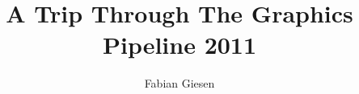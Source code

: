 \documentclass[DIV10]{scrreprt}
\begin{document}


\title{A Trip Through The Graphics Pipeline 2011}
\author{Fabian Giesen}
\maketitle
\tableofcontents




\end{document}
